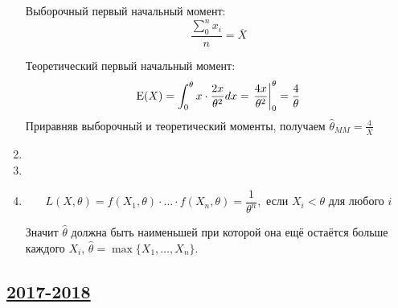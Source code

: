 \begin{enumerate}
Выборочный первый начальный момент:
\[
\frac{\sum_{0}^{n}{x_{i}}}{n} = \overline{X}
\]

Теоретический первый начальный момент: 
\[
\operatorname{E} (X) = \int_{0}^{\theta} x \cdot \frac{2x}{\theta^{2}} dx = \left. \frac{4x}{\theta^{2}} \right|_{0}^{\theta} = \frac{4}{\theta}
\]
Приравняв выборочный и теоретический моменты, получаем $\hat{\theta}_{MM}=\frac{4}{\overline{X}}$
\item
\item

\item

\[
L(X, \theta)  = f(X_1, \theta) \cdot \ldots \cdot f(X_n, \theta) = \frac{1}{\theta^n}, \text{ если } X_i < \theta \text{ для любого } i 
\]

Значит $\hat{\theta}$ должна быть наименьшей при которой она ещё остаётся больше каждого $X_i$, $\hat{\theta} = \max\{X_1, \ldots, X_n\}$.

\end{enumerate}


\subsection[2017-2018]{\hyperref[sec:kr_03_2017_2018]{2017-2018}}
\label{sec:sol_kr_03_2017_2018}


